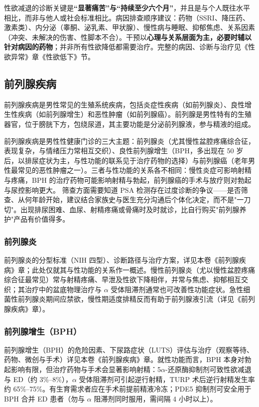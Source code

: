 \documentclass[12pt,a4paper,twoside]{ctexbook}
\begin{document}
性欲减退的诊断关键是\textbf{“显著痛苦”与“持续至少六个月”}，并且是与个人既往水平相比，而非与他人或社会标准相比。病因排查顺序建议：药物（SSRI、降压药、激素类）、内分泌（睾酮、泌乳素、甲状腺）、慢性病与睡眠、抑郁焦虑、关系因素（冲突、未解决的伤害、性脚本不合）。干预以\textbf{心理与关系层面为主，必要时辅以针对病因的药物}；并非所有性欲降低都需要治疗。完整的病因、诊断与治疗见《性欲异常》章《性欲低下》节。

\subsection{前列腺疾病}

前列腺疾病是男性常见的生殖系统疾病，包括炎症性疾病（如前列腺炎）、良性增生性疾病（如前列腺增生）和恶性肿瘤（如前列腺癌）。前列腺是男性特有的生殖器官，位于膀胱下方，包绕尿道，其主要功能是分泌前列腺液，参与精液的组成。


前列腺疾病是男性性健康门诊的三大主题：前列腺炎（尤其慢性盆腔疼痛综合征，表现复杂，与情绪压力常相互交织）、良性前列腺增生（BPH，多出现在 50 岁后，以排尿症状为主，与性功能的联系见于治疗药物的选择）与前列腺癌（老年男性最常见的恶性肿瘤之一）。三者与性功能的关系各不相同：慢性炎症可影响射精与疼痛，BPH 的治疗药物可能影响射精与勃起，前列腺癌的手术与放疗则对勃起与尿控影响更大。
筛查方面需要知道 PSA 检测存在过度诊断的争议——是否筛查、从何年龄开始，建议结合家族史与医生充分沟通后个体化决定，而不是"一刀切"。出现排尿困难、血尿、射精疼痛或骨痛时及时就诊，比自行购买"前列腺养护"产品有价值得多。

\subsubsection{前列腺炎}
前列腺炎的分型标准（NIH 四型）、诊断路径与治疗方案，详见本卷《前列腺疾病》章；此处仅就其与性功能的关系作一概述。慢性前列腺炎（尤以慢性盆腔疼痛综合征最常见）常与射精疼痛、早泄及性欲下降相伴，并常与焦虑、抑郁相互交织；其治疗中的盆底物理治疗与 $\alpha$ 受体阻滞剂通常也可改善性功能症状。急性细菌性前列腺炎期间应禁欲，慢性期适度排精反而有助于前列腺液引流（详见《前列腺疾病》章）。

\subsubsection{前列腺增生（BPH）}
前列腺增生（BPH）的危险因素、下尿路症状（LUTS）评估与治疗（观察等待、药物、微创与手术）详见本卷《前列腺疾病》章。就性功能而言，BPH 本身对勃起影响有限，但治疗药物与手术会显著影响射精：5$\alpha$-还原酶抑制剂可致性欲减退与 ED（约 3\%--8\%），$\alpha$ 受体阻滞剂可引起逆行射精，TURP 术后逆行射精发生率约 65\%--75\%。有生育需求者应在手术前提前精液冷冻；PDE5 抑制剂可安全用于 BPH 合并 ED 患者（勿与 $\alpha$ 阻滞剂同时服用，需间隔 4 小时以上）。
\end{document}
